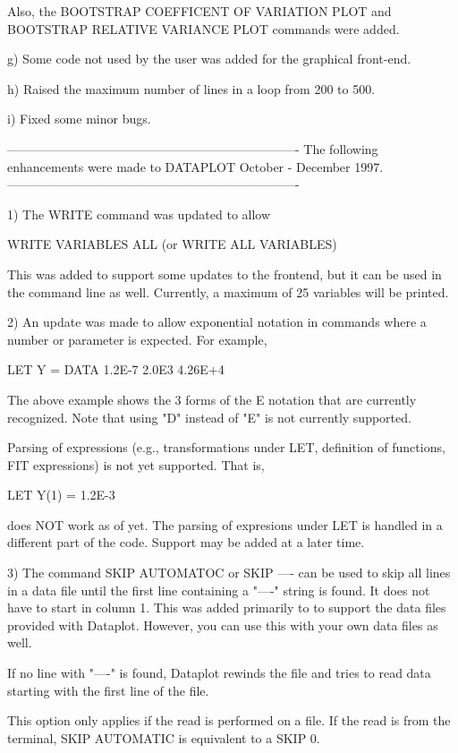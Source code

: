 {      Also, the BOOTSTRAP COEFFICENT OF VARIATION PLOT and
      BOOTSTRAP RELATIVE VARIANCE PLOT commands were added.
   
    g) Some code not used by the user was added for the graphical
       front-end.

    h) Raised the maximum number of lines in a loop from 200 to 500.

    i) Fixed some minor bugs.

----------------------------------------------------------------------
The following enhancements were made to DATAPLOT October - December 1997.
----------------------------------------------------------------------

 1) The WRITE command was updated to allow

        WRITE VARIABLES ALL (or WRITE ALL VARIABLES)

    This was added to support some updates to the frontend, but it
    can be used in the command line as well.  Currently, a maximum
    of 25 variables will be printed.

 2) An update was made to allow exponential notation in commands
    where a number or parameter is expected.  For example,

       LET Y = DATA 1.2E-7  2.0E3  4.26E+4

    The above example shows the 3 forms of the E notation that
    are currently recognized.  Note that using "D" instead of
    "E" is not currently supported.

    Parsing of expressions (e.g., transformations under LET,
    definition of functions, FIT expressions) is not yet supported.
    That is,

       LET Y(1) = 1.2E-3

    does NOT work as of yet.  The parsing of expresions under
    LET is handled in a different part of the code.  Support
    may be added at a later time.

 3) The command SKIP AUTOMATOC or SKIP ---- can be used to
    skip all lines in a data file until the first line
    containing a  "----" string is found.  It does not have to
    start in column 1.  This was added primarily to
    to support the data files provided with Dataplot.  However,
    you can use this with your own data files as well.

    If no line with "----" is found, Dataplot rewinds the file
    and tries to read data starting with the first line of the
    file.

    This option only applies if the read is performed on a file.
    If the read is from the terminal, SKIP AUTOMATIC is
    equivalent to a SKIP 0.

}
